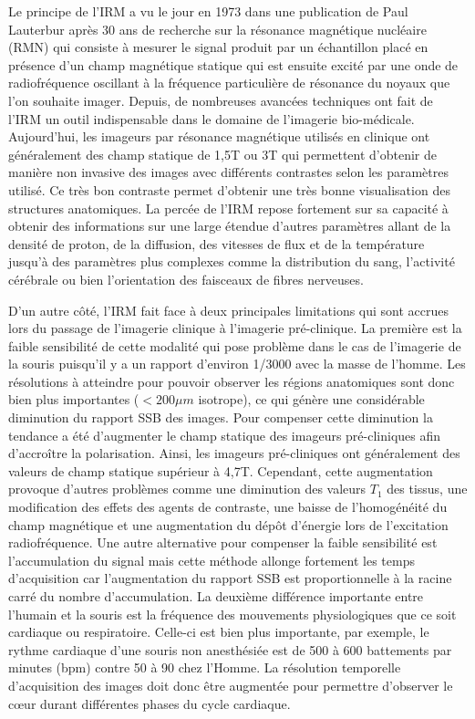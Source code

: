 \medbreak
Le principe de l'IRM a vu le jour en 1973 dans une publication de Paul Lauterbur \cite{lauterbur1973image} après 30 ans de recherche sur la résonance magnétique nucléaire (RMN) qui consiste à mesurer le signal produit par un échantillon placé en présence d'un champ magnétique statique qui est ensuite excité par une onde de radiofréquence oscillant à la fréquence particulière de résonance du noyaux que l'on souhaite imager. Depuis, de nombreuses avancées techniques ont fait de l'IRM un outil indispensable dans le domaine de l'imagerie bio-médicale. Aujourd'hui, les imageurs par résonance magnétique utilisés en clinique ont généralement des champ statique de 1,5T ou 3T qui permettent d'obtenir de manière non invasive des images avec différents contrastes selon les paramètres utilisé. Ce très bon contraste permet d'obtenir une très bonne visualisation des structures anatomiques. La percée de l'IRM repose fortement sur sa capacité à obtenir des informations sur une large étendue d'autres paramètres allant de la densité de proton, de la diffusion, des vitesses de flux et de la température jusqu'à des paramètres plus complexes comme la distribution du sang, l'activité cérébrale ou bien l'orientation des faisceaux de fibres nerveuses.

\medbreak
D'un autre côté, l'IRM fait face à deux principales limitations qui sont accrues lors du passage de l'imagerie clinique à l'imagerie pré-clinique. La première est la faible sensibilité de cette modalité qui pose problème dans le cas de l'imagerie de la souris puisqu'il y a un rapport d'environ 1/3000 avec la masse de l'homme. Les résolutions à atteindre pour pouvoir observer les régions anatomiques sont donc bien plus importantes ($< 200 \mu m$ isotrope), ce qui génère une considérable diminution du rapport \gls{SSB} des images. Pour compenser cette diminution la tendance a été d'augmenter le champ statique des imageurs pré-cliniques afin d'accroître la polarisation. Ainsi, les imageurs pré-cliniques ont généralement des valeurs de champ statique supérieur à 4,7T. Cependant, cette augmentation provoque d'autres problèmes comme une diminution des valeurs $T_1$ des tissus, une modification des effets des agents de contraste, une baisse de l'homogénéité du champ magnétique et une augmentation du dépôt d'énergie lors de l'excitation radiofréquence. Une autre alternative pour compenser la faible sensibilité est l'accumulation du signal mais cette méthode allonge fortement les temps d'acquisition car l'augmentation du rapport \gls{SSB} est proportionnelle à la racine carré du nombre d'accumulation.
La deuxième différence importante entre l'humain et la souris est la fréquence des mouvements physiologiques que ce soit cardiaque ou respiratoire. Celle-ci est bien plus importante, par exemple, le rythme cardiaque d'une souris non anesthésiée est de 500 à 600 battements par minutes (bpm) contre 50 à 90 chez l'Homme. La résolution temporelle d'acquisition des images doit donc être augmentée pour permettre d'observer le cœur durant différentes phases du cycle cardiaque.

